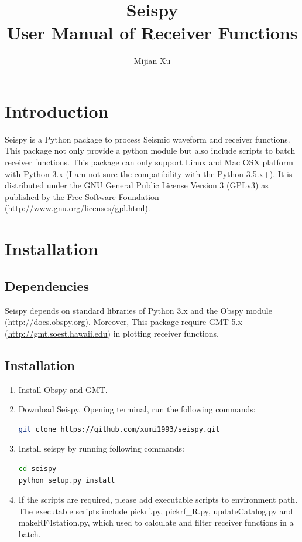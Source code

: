 \documentclass[12pt, a4paper]{report}
\title{Seispy\\User Manual of Receiver Functions}
\author[1,*]{Mijian Xu}
\affil[1]{\small School of Earth Science and Engineering, Nanjing University}
\affil[*]{\small Email: gomijianxu@gmail.com}
\begin{document}
\maketitle
\tableofcontents

\chapter{Introduction}
Seispy is a Python package to process Seismic waveform and receiver functions. This package not only provide a python module but also include scripts to batch receiver functions. This package can only support Linux and Mac OSX platform with Python 3.x (I am not sure the compatibility with the Python 3.5.x+). It is distributed under the GNU General Public License Version 3 (GPLv3) as published by the Free Software Foundation (\url{http://www.gnu.org/licenses/gpl.html}).

\chapter{Installation}

\section{Dependencies}
Seispy depends on standard libraries of Python 3.x and the Obspy module (\url{http://docs.obspy.org}). Moreover, This package require GMT 5.x (\url{http://gmt.soest.hawaii.edu}) in plotting receiver functions.

\section{Installation}
\begin{enumerate}
\item Install Obspy and GMT.
\item Download Seispy. Opening terminal, run the following commands:
\begin{lstlisting}[language=bash]
git clone https://github.com/xumi1993/seispy.git
\end{lstlisting}
\item Install seispy by running following commands:
\begin{lstlisting}[language=bash]
cd seispy
python setup.py install
\end{lstlisting}
\item If the scripts are required, please add executable scripts to environment path. The executable scripts include {\C pickrf.py, pickrf\_R.py, updateCatalog.py} and {\C makeRF4station.py}, which used to calculate and filter receiver functions in a batch.
\end{enumerate}
\end{document}
